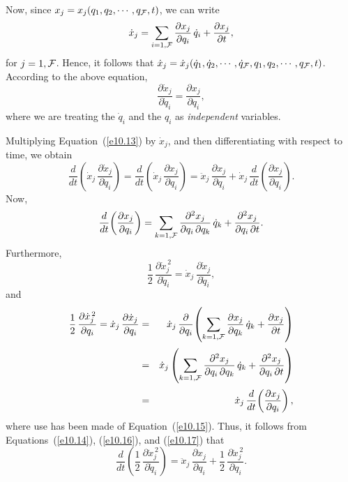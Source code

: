 Now, since $x_j=x_j(q_1,q_2,\cdots, q_{\cal F},t)$, we can write
\begin{equation}
\dot{x}_j= \sum_{i=1,{\cal F}} \frac{\partial x_j}{\partial q_i}\,\dot{q}_i
+ \frac{\partial x_j}{\partial t},
\end{equation}
for $j=1,{\cal F}$.
Hence, it follows that $\dot{x}_j = \dot{x}_j(\dot{q}_1,\dot{q}_2,\cdots,
\dot{q}_{\cal F},q_1,q_2,\cdots,q_{\cal F},t)$. According to the
above equation,
\begin{equation}\label{e10.13}
\frac{\partial \dot{x}_j}{\partial\dot{q}_i} = \frac{\partial x_j}{\partial q_i},
\end{equation}
where we are treating the $\dot{q}_i$ and the $q_i$ as {\em independent}\/
variables.

Multiplying Equation~(\ref{e10.13}) by $\dot{x}_j$, and then differentiating
with respect to time, we obtain
\begin{equation}\label{e10.14}
\frac{d}{dt}\!\left(\dot{x}_j\,\frac{\partial \dot{x}_j}{\partial \dot{q}_i}\right)
= \frac{d}{dt}\!\left(\dot{x}_j\,\frac{\partial x_j}{\partial q_i}\right)
=\ddot{x}_j\, \frac{\partial x_j}{\partial q_i} + \dot{x}_j\,\frac{d}{dt}\!\left(
\frac{\partial x_j}{\partial q_i}\right).
\end{equation}
Now,
\begin{equation}\label{e10.15}
\frac{d}{dt}\!\left(\frac{\partial x_j}{\partial q_i}\right) = \sum_{k=1,{\cal F}}
\frac{\partial^2 x_j}{\partial q_i\,\partial q_k}\,\dot{q}_k + 
\frac{\partial^2 x_j}{\partial q_i\,\partial t}.
\end{equation}
Furthermore,
\begin{equation}\label{e10.16}
\frac{1}{2} \,\frac{\partial\dot{x}_j^{\,2}}{\partial \dot{q}_i}
= \dot{x}_j\,\frac{\partial \dot{x}_j}{\partial \dot{q}_i},
\end{equation}
and
\begin{eqnarray}\label{e10.17}
\frac{1}{2}\,\frac{\partial \dot{x}_j^{\,2}}{\partial q_i}
= \dot{x}_j\,\frac{\partial \dot{x}_j}{\partial q_i} &=&
\dot{x}_j\,\frac{\partial}{\partial q_i}\!\left(\sum_{k=1,{\cal F}}\frac{\partial x_j}{\partial q_k}\,\dot{q}_k + 
\frac{\partial x_j}{\partial t}\right)\nonumber\\[0.5ex]& =& \dot{x}_j\left(\sum_{k=1,{\cal F}}\frac{\partial^2 x_j}{\partial q_i\,\partial q_k}\,\dot{q}_k + 
\frac{\partial^2 x_j}{\partial q_i\,\partial t}\right)\nonumber\\[0.5ex]
&=& \dot{x}_j\,\frac{d}{dt}\!\left(\frac{\partial x_j}{\partial q_i}\right),
\end{eqnarray}
where use has been made of Equation~(\ref{e10.15}). Thus, it follows
from Equations~(\ref{e10.14}), (\ref{e10.16}), and (\ref{e10.17}) that
\begin{equation}
\frac{d}{dt}\!\left(\frac{1}{2}\,\frac{\partial \dot{x}_j^{\,2}}{\partial \dot{q}_i}\right) = \ddot{x}_j\,\frac{\partial x_j}{\partial q_i} + \frac{1}{2}\,\frac{\partial \dot{x}_j^{\,2}}{\partial q_i}.
\end{equation}

